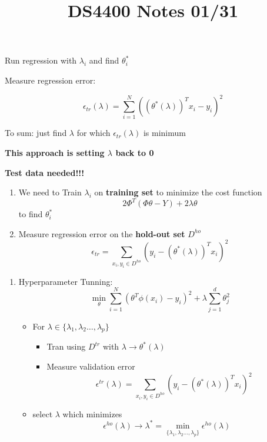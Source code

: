 \documentclass[12pt]{article}
\begin{document}
\begin{multicols}{2}
\begin{enumerate}
\begin{enumerate}
                Run regression with $\lambda_i$ and find $\theta^*_i$

                Measure regression error:

                $$\epsilon_{tr}(\lambda) = \sum_{i=1}^N ((\theta^*(\lambda))^T x_i - y_i)^2$$

                To sum: just find $\lambda$ for which $\epsilon_{tr}(\lambda)$ is minimum
            \end{enumerate}

            \textbf{This approach is setting $\lambda$ back to 0}

            \textbf{Test data needed!!!}

            \begin{enumerate}
                \item We need to Train $\lambda_i$ on \textbf{training set} to minimize the cost function $$2\Phi^T(\Phi \theta - Y) + 2\lambda \theta$$ to find $\theta^*_i$
                \item Measure regression error on the \textbf{hold-out set} $D^{ho}$
                $$\epsilon_{tr} = \sum_{x_i,y_i \in D^{ho} } (y_i - (\theta^*(\lambda))^Tx_i)^2$$

            \end{enumerate}
        \end{enumerate}
        \title{DS4400 Notes 01/31}
        \maketitle

        \begin{enumerate}
            \item Hyperparameter Tunning:
            $$\min_{\theta} \sum_{i = 1}^{N}(\theta^T\phi(x_i) - y_i)^2 + \lambda \sum_{j = 1}^d \theta_j^2$$

            \begin{itemize}
                \item For $\lambda \in \{\lambda_1, \lambda_2 \dots, \lambda_p\}$
                \begin{itemize}
                    \item Tran using $D^{tr}$ with $\lambda \rightarrow \theta^*(\lambda)$
                    \item Measure validation error $$\epsilon^{tr}(\lambda) = \sum_{x_i,y_i \in D^{ho} } (y_i - (\theta^*(\lambda))^Tx_i)^2$$
                \end{itemize}
                \item select $\lambda$ which minimizes $$\epsilon^{ho}(\lambda)  \rightarrow \lambda^* =  \min_{\{\lambda_1, \lambda_2 \dots, \lambda_p\}}\epsilon^{ho}(\lambda)$$
            \end{itemize}


\end{enumerate}
\end{multicols}
\end{document}
